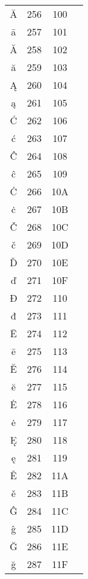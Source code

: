 \documentclass[10pt]{article}
\begin{document}
\begin{tabular}{crcl}
Ā&256&100&\\
ā&257&101&\\
Ă&258&102&\\
ă&259&103&\\
Ą&260&104&\\
ą&261&105&\\
Ć&262&106&\\
ć&263&107&\\
Ĉ&264&108&\\
ĉ&265&109&\\
Ċ&266&10A&\\
ċ&267&10B&\\
Č&268&10C&\\
č&269&10D&\\
Ď&270&10E&\\
ď&271&10F&\\
Đ&272&110&\\
đ&273&111&\\
Ē&274&112&\\
ē&275&113&\\
Ĕ&276&114&\\
ĕ&277&115&\\
Ė&278&116&\\
ė&279&117&\\
Ę&280&118&\\
ę&281&119&\\
Ě&282&11A&\\
ě&283&11B&\\
Ĝ&284&11C&\\
ĝ&285&11D&\\
Ğ&286&11E&\\
ğ&287&11F&\\
\end{tabular}
\end{document}
